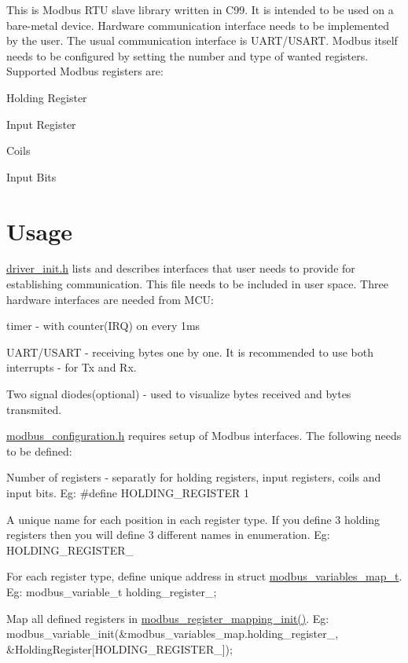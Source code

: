 This is Modbus R\+TU slave library written in C99. It is intended to be used on a bare-\/metal device. Hardware communication interface needs to be implemented by the user. The usual communication interface is U\+A\+R\+T/\+U\+S\+A\+RT. Modbus itself needs to be configured by setting the number and type of wanted registers. Supported Modbus registers are\+:
\begin{DoxyItemize}
\item Holding Register
\item Input Register
\item Coils
\item Input Bits
\end{DoxyItemize}

\section*{Usage}

{\ttfamily \mbox{\hyperlink{driver__init_8h}{driver\+\_\+init.\+h}}} lists and describes interfaces that user needs to provide for establishing communication. This file needs to be included in user space. Three hardware interfaces are needed from M\+CU\+:
\begin{DoxyItemize}
\item timer -\/ with counter(\+I\+R\+Q) on every 1ms
\item U\+A\+R\+T/\+U\+S\+A\+RT -\/ receiving bytes one by one. It is recommended to use both interrupts -\/ for Tx and Rx.
\item Two signal diodes(optional) -\/ used to visualize bytes received and bytes transmited.
\end{DoxyItemize}

{\ttfamily \mbox{\hyperlink{modbus__configuration_8h}{modbus\+\_\+configuration.\+h}}} requires setup of Modbus interfaces. The following needs to be defined\+:
\begin{DoxyItemize}
\item Number of registers -\/ separatly for holding registers, input registers, coils and input bits. Eg\+: {\ttfamily \#define H\+O\+L\+D\+I\+N\+G\+\_\+\+R\+E\+G\+I\+S\+T\+ER 1}
\item A unique name for each position in each register type. If you define 3 holding registers then you will define 3 different names in enumeration. Eg\+: {\ttfamily H\+O\+L\+D\+I\+N\+G\+\_\+\+R\+E\+G\+I\+S\+T\+E\+R\+\_}
\item For each register type, define unique address in struct \mbox{\hyperlink{structmodbus__variables__map__t}{modbus\+\_\+variables\+\_\+map\+\_\+t}}. Eg\+: {\ttfamily modbus\+\_\+variable\+\_\+t holding\+\_\+register\+\_;}
\item Map all defined registers in \mbox{\hyperlink{group___insert_ga6dbaaf108ca00d5dfd1037aadfc10f6f}{modbus\+\_\+register\+\_\+mapping\+\_\+init()}}. Eg\+: {\ttfamily modbus\+\_\+variable\+\_\+init(\&modbus\+\_\+variables\+\_\+map.\+holding\+\_\+register\+\_, \&Holding\+Register\mbox{[}H\+O\+L\+D\+I\+N\+G\+\_\+\+R\+E\+G\+I\+S\+T\+E\+R\+\_\mbox{]});}
\end{DoxyItemize}

